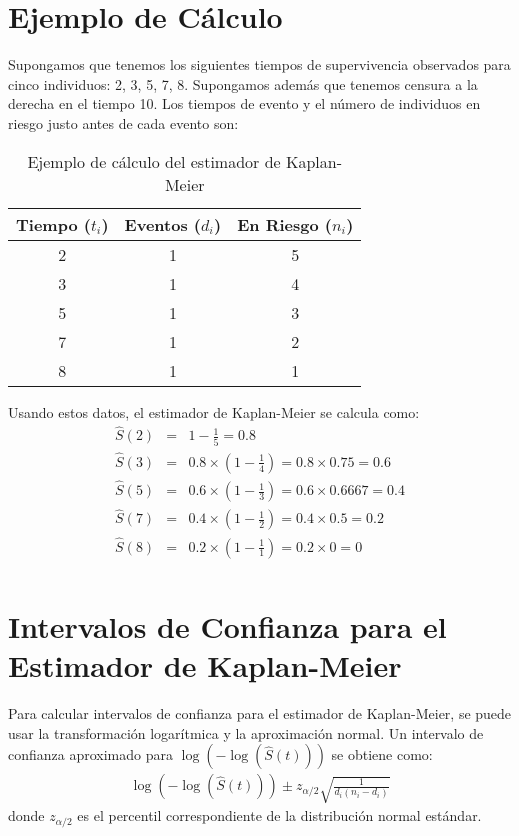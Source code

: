 \documentclass[a4paper]{report} %
\begin{document}
\section{Ejemplo de C\'alculo}
Supongamos que tenemos los siguientes tiempos de supervivencia observados para cinco individuos: 2, 3, 5, 7, 8. Supongamos adem\'as que tenemos censura a la derecha en el tiempo 10. Los tiempos de evento y el n\'umero de individuos en riesgo justo antes de cada evento son:

\begin{table}[h]
\centering
\begin{tabular}{|c|c|c|}
\hline
Tiempo ($t_i$) & Eventos ($d_i$) & En Riesgo ($n_i$) \\
\hline
2 & 1 & 5 \\
3 & 1 & 4 \\
5 & 1 & 3 \\
7 & 1 & 2 \\
8 & 1 & 1 \\
\hline
\end{tabular}
\caption{Ejemplo de c\'alculo del estimador de Kaplan-Meier}
\end{table}

Usando estos datos, el estimador de Kaplan-Meier se calcula como:
\begin{eqnarray*}
\hat{S}(2) &=& 1 - \frac{1}{5} = 0.8 \\
\hat{S}(3) &=& 0.8 \times \left(1 - \frac{1}{4}\right) = 0.8 \times 0.75 = 0.6 \\
\hat{S}(5) &=& 0.6 \times \left(1 - \frac{1}{3}\right) = 0.6 \times 0.6667 = 0.4 \\
\hat{S}(7) &=& 0.4 \times \left(1 - \frac{1}{2}\right) = 0.4 \times 0.5 = 0.2 \\
\hat{S}(8) &=& 0.2 \times \left(1 - \frac{1}{1}\right) = 0.2 \times 0 = 0 \\
\end{eqnarray*}

\section{Intervalos de Confianza para el Estimador de Kaplan-Meier}
Para calcular intervalos de confianza para el estimador de Kaplan-Meier, se puede usar la transformaci\'on logar\'itmica y la aproximaci\'on normal. Un intervalo de confianza aproximado para $\log(-\log(\hat{S}(t)))$ se obtiene como:
\begin{eqnarray*}
\log(-\log(\hat{S}(t))) \pm z_{\alpha/2} \sqrt{\frac{1}{d_i(n_i - d_i)}}
\end{eqnarray*}
donde $z_{\alpha/2}$ es el percentil correspondiente de la distribuci\'on normal est\'andar.
\end{document}
